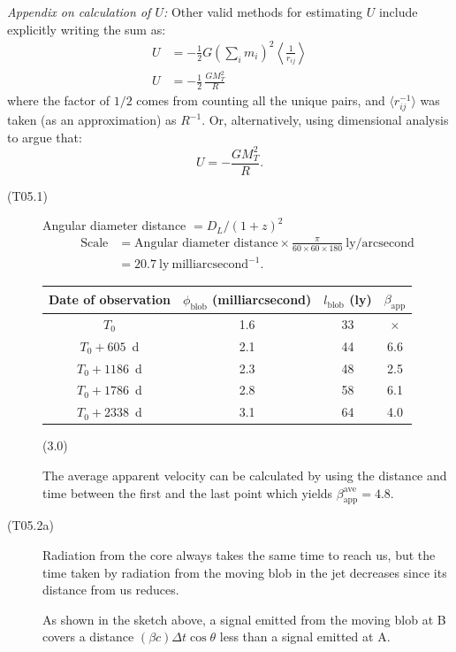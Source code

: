 \medskip
\noindent\emph{Appendix on calculation of $U$:} Other valid methods for
estimating $U$ include explicitly writing the sum as:
\begin{align*}
U &= -\frac{1}{2} G \left(\sum_i m_i\right)^{2}
     \left\langle \frac{1}{r_{ij}} \right\rangle \\
U &= -\frac{1}{2}\,\frac{G M_T^2}{R}
\end{align*}
where the factor of $1/2$ comes from counting all the unique pairs, and
$\langle r_{ij}^{-1} \rangle$ was taken (as an approximation) as $R^{-1}$.
Or, alternatively, using dimensional analysis to argue that:
\[
U = -\frac{G M_T^2}{R}.
\]

\begin{description}
\item[(T05.1)] Angular diameter distance $= D_L/(1+z)^2$
  \begin{align*}
  \text{Scale} &= \text{Angular diameter distance} \times
    \frac{\pi}{60 \times 60 \times 180}~\mathrm{ly/arcsecond} \\
  &= 20.7~\mathrm{ly~milliarcsecond^{-1}}.
  \tag*{(1.0)}
  \end{align*}
  \begin{center}
  \begin{tabular}{cccc}
  Date of observation & $\phi_{\mathrm{blob}}$ (milliarcsecond)
    & $l_{\mathrm{blob}}$ (ly) & $\beta_{\mathrm{app}}$ \\
  \hline
  $T_0$            & 1.6 & 33 & $\times$ \\
  $T_0 + 605$~d    & 2.1 & 44 & 6.6 \\
  $T_0 + 1186$~d   & 2.3 & 48 & 2.5 \\
  $T_0 + 1786$~d   & 2.8 & 58 & 6.1 \\
  $T_0 + 2338$~d   & 3.1 & 64 & 4.0 \\
  \end{tabular}
  \hfill(3.0)
  \end{center}
  The average apparent velocity can be calculated by using the distance and
  time between the first and the last point which yields
  $\beta^{\mathrm{ave}}_{\mathrm{app}} = 4.8$.

\item[(T05.2a)] Radiation from the core always takes the same time to reach
  us, but the time taken by radiation from the moving blob in the jet
  decreases since its distance from us reduces.

  As shown in the sketch above, a signal emitted from the moving blob at B
  covers a distance $(\beta c)\Delta t \cos\theta$ less than a signal emitted
  at A.


\end{description}
